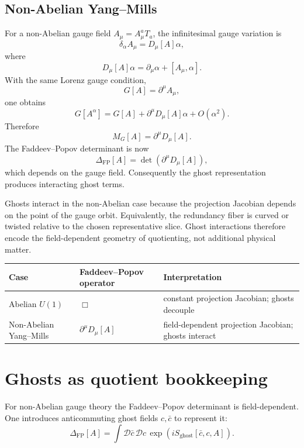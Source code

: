\documentclass[11pt]{article}
\newcommand{\FP}{\mathrm{FP}}
\begin{document}
\subsection{Non-Abelian Yang--Mills}

For a non-Abelian gauge field \(A_\mu=A_\mu^aT_a\), the infinitesimal gauge variation is
\[
\delta_\alpha A_\mu = D_\mu[A]\alpha ,
\]
where
\[
D_\mu[A]\alpha=\partial_\mu\alpha+[A_\mu,\alpha].
\]
With the same Lorenz gauge condition,
\[
G[A]=\partial^\mu A_\mu,
\]
one obtains
\[
G[A^\alpha]=G[A]+\partial^\mu D_\mu[A]\alpha+O(\alpha^2).
\]
Therefore
\[
M_G[A]=\partial^\mu D_\mu[A].
\]
The Faddeev--Popov determinant is now
\[
\Delta_{\FP}[A]=\det(\partial^\mu D_\mu[A]),
\]
which depends on the gauge field. Consequently the ghost representation produces interacting ghost terms.

\begin{remark}
Ghosts interact in the non-Abelian case because the projection Jacobian depends on the point of the gauge orbit. Equivalently, the redundancy fiber is curved or twisted relative to the chosen representative slice. Ghost interactions therefore encode the field-dependent geometry of quotienting, not additional physical matter.
\end{remark}

\begin{center}
\begin{tabular}{
>{\raggedright\arraybackslash}p{}
>{\raggedright\arraybackslash}p{}
>{\raggedright\arraybackslash}p{}}
\hline
Case & Faddeev--Popov operator & Interpretation\\
\hline
Abelian \(U(1)\) & \(\Box\) & constant projection Jacobian; ghosts decouple\\
Non-Abelian Yang--Mills & \(\partial^\mu D_\mu[A]\) & field-dependent projection Jacobian; ghosts interact\\
\hline
\end{tabular}
\end{center}

\section{Ghosts as quotient bookkeeping}

For non-Abelian gauge theory the Faddeev--Popov determinant is field-dependent. One introduces anticommuting ghost fields \(c,\bar c\) to represent it:
\[
\Delta_{\FP}[A]
=
\int \mathcal D\bar c\,\mathcal Dc\,
\exp\left(iS_{\mathrm{ghost}}[\bar c,c,A]\right).
\]
\end{document}
